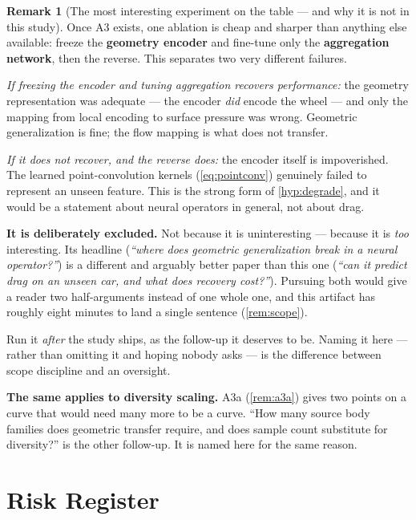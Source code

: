 \documentclass[10pt,a4paper]{article}
\theoremstyle{definition}
\newtheorem{remark}{Remark}[section]
\begin{document}
\begin{remark}[The most interesting experiment on the table --- and why it is not in this study]
\label{rem:ablation}
Once A3 exists, one ablation is cheap and sharper than anything else available: freeze
the \textbf{geometry encoder} and fine-tune only the \textbf{aggregation network}, then
the reverse. This separates two very different failures.

\emph{If freezing the encoder and tuning aggregation recovers performance:} the geometry
representation was adequate --- the encoder \emph{did} encode the wheel --- and only the
mapping from local encoding to surface pressure was wrong. Geometric generalization is
fine; the flow mapping is what does not transfer.

\emph{If it does not recover, and the reverse does:} the encoder itself is impoverished.
The learned point-convolution kernels (\cref{eq:pointconv}) genuinely failed to
represent an unseen feature. This is the strong form of \cref{hyp:degrade}, and it
would be a statement about neural operators in general, not about drag.

\textbf{It is deliberately excluded.} Not because it is uninteresting --- because it is
\emph{too} interesting. Its headline (\emph{``where does geometric generalization break
in a neural operator?''}) is a different and arguably better paper than this one
(\emph{``can it predict drag on an unseen car, and what does recovery cost?''}).
Pursuing both would give a reader two half-arguments instead of one whole one, and this
artifact has roughly eight minutes to land a single sentence (\cref{rem:scope}).

Run it \emph{after} the study ships, as the follow-up it deserves to be. Naming it here
--- rather than omitting it and hoping nobody asks --- is the difference between scope
discipline and an oversight.

\textbf{The same applies to diversity scaling.} A3a (\cref{rem:a3a}) gives two points on
a curve that would need many more to be a curve. ``How many source body families does
geometric transfer require, and does sample count substitute for diversity?'' is the
other follow-up. It is named here for the same reason.
\end{remark}

\section{Risk Register}
\end{document}
